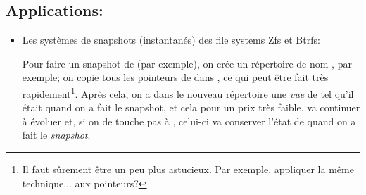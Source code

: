  \subsection*{Applications:}
\begin{itemize}
  \item Les systèmes de \og snapshots\fg{} (instantanés)  des file
    systems Zfs et 
    Btrfs:

    Pour faire un snapshot de  (par exemple), on crée un
    répertoire de nom , par exemple; on copie tous les
    pointeurs de  dans , ce qui peut être
    fait très rapidement\footnote{Il faut sûrement être un peu plus
      astucieux. Par exemple, appliquer la même technique... aux
      pointeurs?}. Après cela, on a dans le nouveau répertoire 
    une \emph{vue} de  tel qu'il était quand on a fait le
    snapshot, et cela pour un \og prix\fg{} très faible.  va
    continuer à évoluer et, si on de touche pas à , celui-ci
    va conserver l'état de  quand on a fait le \emph{snapshot}.
    
\end{itemize}


